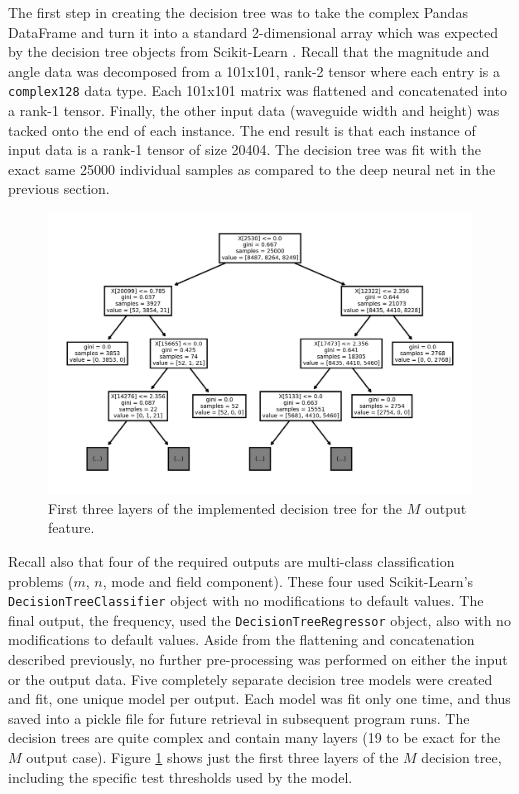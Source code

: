 \documentclass[conference]{IEEEtran}
\begin{document}
The first step in creating the decision tree was to take the complex Pandas DataFrame and turn it into a standard 2-dimensional array which was expected by the decision tree objects from Scikit-Learn \cite{pedregosa_scikit-learn_2011}.
Recall that the magnitude and angle data was decomposed from a 101x101, rank-2 tensor where each entry is a \verb*|complex128| data type.
Each 101x101 matrix was flattened and concatenated into a rank-1 tensor. 
Finally, the other input data (waveguide width and height) was tacked onto the end of each instance.
The end result is that each instance of input data is a rank-1 tensor of size 20404. 
The decision tree was fit with the exact same 25000 individual samples as compared to the deep neural net in the previous section.

\begin{figure}
	\centering
	\includegraphics[width=1\linewidth]{images/dt_top}
	\caption{First three layers of the implemented decision tree for the $M$ output feature.}
	\label{fig:dt_top}
\end{figure}

Recall also that four of the required outputs are multi-class classification problems ($m$, $n$, mode and field component). 
These four used Scikit-Learn's \verb*|DecisionTreeClassifier| object\cite{noauthor_110_nodate} with no modifications to default values.
The final output, the frequency, used the \verb*|DecisionTreeRegressor| object, also with no modifications to default values.
Aside from the flattening and concatenation described previously, no further pre-processing was performed on either the input or the output data.
Five completely separate decision tree models were created and fit, one unique model per output. 
Each model was fit only one time, and thus saved into a pickle file for future retrieval in subsequent program runs.
The decision trees are quite complex and contain many layers (19 to be exact for the $M$ output case). 
Figure \ref{fig:dt_top} shows just the first three layers of the $M$ decision tree, including the specific test thresholds used by the model.
\end{document}
